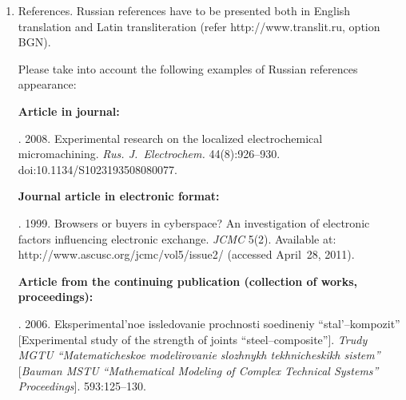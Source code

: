 {{\begin{enumerate}[1.]
\begin{itemize}
\thispagestyle{empty}

\item abstract (not less than 100 words) both in Russian and in English. Abstract is a short 
summary of the article that can be published separately. The abstract is the 
main source of information on the article and it could be included in leading information 
systems and data bases. The abstract in English has to be an original text and should 
not be an exact translation of the Russian one. Good English is required. 
In abstracts, avoid references and formulae;\\[-13.5pt]
\item indexing is performed on the basis of keywords. The use of keywords from the 
internationally accepted thematic Thesauri is recommended. 

Important! Keywords must not be sentences.
\end{itemize}

\item References. Russian references have to be presented both in English translation and Latin 
transliteration (refer {\sf http://www.translit.ru}, option BGN). 

Please take into account the following examples of Russian references appearance:

\noindent
\textbf{Article in journal:}

. 2008. Experimental research on the localized electrochemical 
micromachining. 
\textit{Rus. J.~Electrochem.}  44(8):926--930. {\sf doi:10.1134/S1023193508080077}.


\noindent
\textbf{Journal article in electronic format:}

. 1999. Browsers or buyers in 
cyberspace? An 
investigation of electronic factors influencing electronic exchange. \textit{JCMC} 
5(2). Available at: {\sf http://www.ascusc.org/jcmc/vol5/issue2/} (accessed April~28, 2011).




\noindent
\textbf{Article from the continuing publication (collection of works, proceedings):}

. 2006. Eksperimental'noe 
issledovanie prochnosti soedineniy ``stal'--kompozit'' [Experimental study of 
the strength of joints ``steel--composite'']. \textit{Trudy MGTU 
``Matematicheskoe modelirovanie slozhnykh tekh\-ni\-che\-skikh sistem''} 
[\textit{Bauman MSTU ``Mathematical Modeling of Complex Technical 
Systems'' Proceedings}]. 593:125--130.


\end{enumerate}}}
